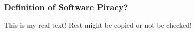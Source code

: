 \subsubsection{Definition of Software Piracy?} \label{subsubsection:foundation-piracy-overview-definition}
This is my real text! Rest might be copied or not be checked!
